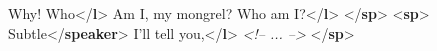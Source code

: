 \begin{shaded}
Why! Who{</\textbf{l}>}\mbox{}\newline 
{}Am I, my mongrel? Who am I?{</\textbf{l}>}\mbox{}\newline 
{</\textbf{sp}>}\mbox{}\newline 
{<\textbf{sp}>}\mbox{}\newline 
{}Subtle{</\textbf{speaker}>}\mbox{}\newline 
{}I'll tell you,{</\textbf{l}>}\mbox{}\newline 
\textit{<!-- ... -->}\mbox{}\newline 
{</\textbf{sp}>}\end{shaded}\egroup\par \par
